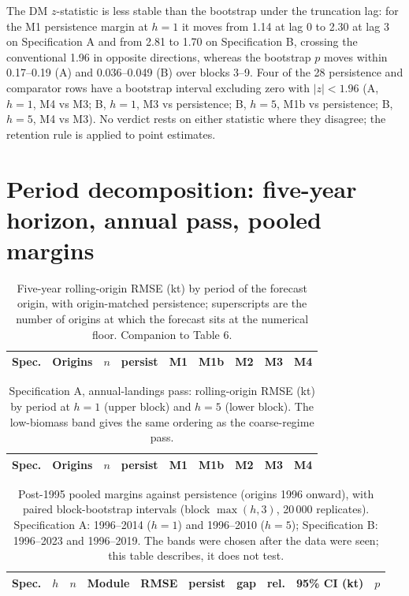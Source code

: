 The DM $z$-statistic is less stable than the bootstrap under the truncation lag: for the M1 persistence margin at $h=1$ it moves from 1.14 at lag 0 to 2.30 at lag 3 on Specification A and from 2.81 to 1.70 on Specification B, crossing the conventional 1.96 in opposite directions, whereas the bootstrap $p$ moves within 0.17--0.19 (A) and 0.036--0.049 (B) over blocks 3--9. Four of the 28 persistence and comparator rows have a bootstrap interval excluding zero with $|z|<1.96$ (A, $h=1$, M4 vs M3; B, $h=1$, M3 vs persistence; B, $h=5$, M1b vs persistence; B, $h=5$, M4 vs M3). No verdict rests on either statistic where they disagree; the retention rule is applied to point estimates.

\FloatBarrier
\section{Period decomposition: five-year horizon, annual pass, pooled margins}\label{si:periods}

\begin{table}[!htb]
\centering\small
\caption{Five-year rolling-origin RMSE (kt) by period of the forecast origin, with origin-matched persistence; superscripts are the number of origins at which the forecast sits at the numerical floor. Companion to Table 6.}
\label{tab:si_h5}
\begin{tabular}{@{}llrrrrrrr@{}}
\toprule
Spec. & Origins & $n$ & persist & M1 & M1b & M2 & M3 & M4 \\
\midrule

\bottomrule
\end{tabular}
\end{table}

\begin{table}[!htb]
\centering\small
\caption{Specification A, annual-landings pass: rolling-origin RMSE (kt) by period at $h=1$ (upper block) and $h=5$ (lower block). The low-biomass band gives the same ordering as the coarse-regime pass.}
\label{tab:si_annual}
\begin{tabular}{@{}llrrrrrrr@{}}
\toprule
Spec. & Origins & $n$ & persist & M1 & M1b & M2 & M3 & M4 \\
\midrule

\bottomrule
\end{tabular}
\end{table}

\begin{table}[!htb]
\centering\small
\caption{Post-1995 pooled margins against persistence (origins 1996 onward), with paired block-bootstrap intervals (block $\max(h,3)$, 20\,000 replicates). Specification A: 1996--2014 ($h=1$) and 1996--2010 ($h=5$); Specification B: 1996--2023 and 1996--2019. The bands were chosen after the data were seen; this table describes, it does not test.}
\label{tab:si_post1995}
\begin{tabular}{@{}cccllrrrlr@{}}
\toprule
Spec. & $h$ & $n$ & Module & RMSE & persist & gap & rel. & 95\% CI (kt) & $p$ \\
\midrule

\bottomrule
\end{tabular}
\end{table}

